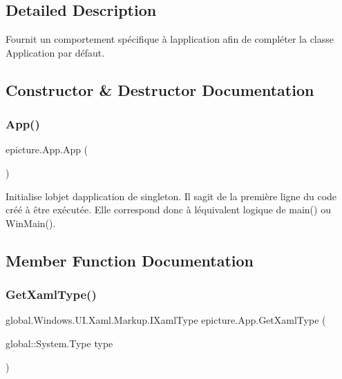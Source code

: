 \subsection{Detailed Description}
Fournit un comportement spécifique à l\textquotesingle{}application afin de compléter la classe Application par défaut. 



\subsection{Constructor \& Destructor Documentation}
\mbox{\label{classepicture_1_1_app_ac385b968cfe8c5cbb76009b068cd5009}} 
\subsubsection{\texorpdfstring{App()}{App()}}
{\footnotesize\ttfamily epicture.\+App.\+App (\begin{DoxyParamCaption}{ }\end{DoxyParamCaption})}



Initialise l\textquotesingle{}objet d\textquotesingle{}application de singleton. Il s\textquotesingle{}agit de la première ligne du code créé à être exécutée. Elle correspond donc à l\textquotesingle{}équivalent logique de main() ou Win\+Main(). 



\subsection{Member Function Documentation}
\mbox{\label{classepicture_1_1_app_ad07aa9948de2fe3ccf94fc72747f6fe8}} 
\subsubsection{\texorpdfstring{Get\+Xaml\+Type()}{GetXamlType()}\hspace{0.1cm}{\footnotesize\ttfamily [1/2]}}
{\footnotesize\ttfamily global.\+Windows.\+U\+I.\+Xaml.\+Markup.\+I\+Xaml\+Type epicture.\+App.\+Get\+Xaml\+Type (\begin{DoxyParamCaption}\item[{global\+::\+System.\+Type}]{type }\end{DoxyParamCaption})}




